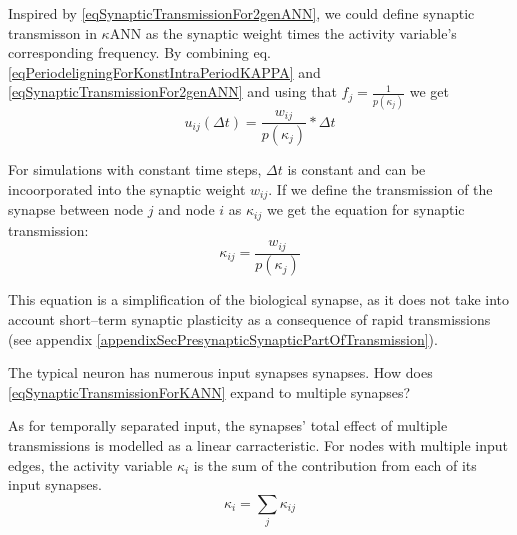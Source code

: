 		Inspired by \eqref{eqSynapticTransmissionFor2genANN}, we could define synaptic transmisson in $\kappa$ANN as the synaptic weight times the activity variable's corresponding frequency.
		By combining eq. \eqref{eqPeriodeligningForKonstIntraPeriodKAPPA} and \eqref{eqSynapticTransmissionFor2genANN} and using that $f_j = \frac{1}{p(\kappa_j)}$ we get
		\begin{equation}
			u_{ij}(\Delta t) = \frac{ w_{ij} }{ p(\kappa_j)} * \Delta t 
			\label{eqSynapticTransmission}
		\end{equation}

		For simulations with constant time steps, $\Delta t$ is constant and can be incoorporated into the synaptic weight $w_{ij}$.
		If we define the transmission of the synapse between node $j$ and node $i$ as $\kappa_{ij}$ we get the equation for synaptic transmission:
		\begin{equation}
			\label{eqSynapticTransmissionForKANN}
			\kappa_{ij} = \frac{ w_{ij} }{ p(\kappa_j)}
		\end{equation}

		This equation is a simplification of the biological synapse,
			as it does not take into account short--term synaptic plasticity as a consequence of rapid transmissions (see appendix \ref{appendixSecPresynapticSynapticPartOfTransmission}).

		The typical neuron has numerous input synapses synapses. 
		How does \eqref{eqSynapticTransmissionForKANN} expand to multiple synapses?
		
		As for temporally separated input, the synapses' total effect of multiple transmissions is modelled as a linear carracteristic.
		For nodes with multiple input edges, the activity variable $\kappa_i$ is the sum of the contribution from each of its input synapses.
		\begin{equation}
			\kappa_i = \sum_j{\kappa_{ij}}
			\label{eqSumOfKij}
		\end{equation}

